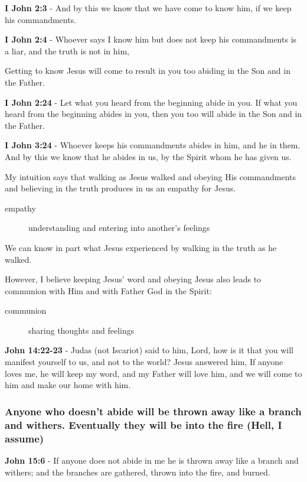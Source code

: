 \documentclass[11pt]{article}
\begin{document}
\textbf{I John 2:3} - And by this we know that we have come to know him, if we keep his commandments.

\textbf{I John 2:4} - Whoever says I know him but does not keep his commandments is a liar, and the truth is not in him,

Getting to know Jesus will come to result in you too abiding in the Son and in the Father.

\textbf{I John 2:24} - Let what you heard from the beginning abide in you. If what you heard from the beginning abides in you, then you too will abide in the Son and in the Father.

\textbf{I John 3:24} - Whoever keeps his commandments abides in him, and he in them. And by this we know that he abides in us, by the Spirit whom he has given us.

My intuition says that walking as Jesus walked and obeying His commandments and believing in the truth produces in us an empathy for Jesus.

\begin{description}
\item[{empathy}] understanding and entering into another's feelings
\end{description}

We can know in part what Jesus experienced by walking in the truth as he walked.

However, I believe keeping Jesus' word and obeying Jesus also leads to communion with Him and with Father God in the Spirit:

\begin{description}
\item[{communion}] sharing thoughts and feelings
\end{description}

\textbf{John 14:22-23} - Judas (not Iscariot) said to him, Lord, how is it that you will manifest yourself to us, and not to the world? Jesus answered him, If anyone loves me, he will keep my word, and my Father will love him, and we will come to him and make our home with him.

\subsubsection{Anyone who doesn't abide will be thrown away like a branch and withers. Eventually they will be into the fire (Hell, I assume)}
\label{sec:org00656b3}
\textbf{John 15:6} - If anyone does not abide in me he is thrown away like a branch and withers; and the branches are gathered, thrown into the fire, and burned.
\end{document}
